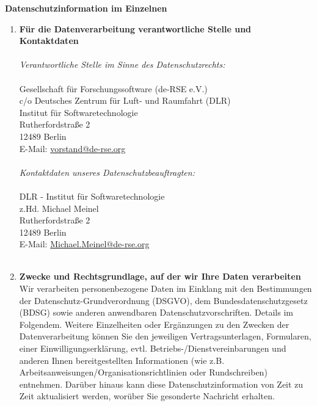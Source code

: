 \documentclass[a4paper, fontsize=11pt]{scrartcl}
\begin{document}
\vspace{1.5cm}
{\Large\textbf{Datenschutzinformation im Einzelnen}} \\

\begin{enumerate}[label=\textbf{\arabic*.},ref=\arabic*]
  \item \label{kontaktdaten} \textbf{Für die Datenverarbeitung verantwortliche Stelle und Kontaktdaten} \\\\
  \textit{Verantwortliche Stelle im Sinne des Datenschutzrechts:} \\\\
  Gesellschaft für Forschungssoftware (de-RSE e.V.) \\
  c/o Deutsches Zentrum für Luft- und Raumfahrt (DLR) \\
  Institut für Softwaretechnologie \\
  Rutherfordstraße 2 \\
  12489 Berlin \\
  E-Mail: \href{mailto:vorstand@de-rse.org}{vorstand@de-rse.org} \\\\
  \textit{Kontaktdaten unseres Datenschutzbeauftragten:} \\\\
  DLR - Institut für Softwaretechnologie\\
  z.Hd. Michael Meinel \\
  Rutherfordstraße 2 \\
  12489 Berlin \\
  E-Mail: \href{mailto:Michael.Meinel@de-rse.org}{Michael.Meinel@de-rse.org} \\\\
  \item \label{zwecke} \textbf{Zwecke und Rechtsgrundlage, auf der wir Ihre Daten verarbeiten} \\ Wir verarbeiten personenbezogene Daten im Einklang mit den Bestimmungen der Datenschutz-Grundverordnung (DSGVO), dem Bundesdatenschutzgesetz (BDSG) sowie anderen anwendbaren Datenschutzvorschriften. Details im Folgendem. Weitere Einzelheiten oder Ergänzungen zu den Zwecken der Datenverarbeitung können Sie den jeweiligen Vertragsunterlagen, Formularen, einer Einwilligungserklärung, evtl. Betriebs-/Dienstvereinbarungen und anderen Ihnen bereitgestellten Informationen (wie z.B. Arbeitsanweisungen/Organisationsrichtlinien oder Rundschreiben) entnehmen. Darüber hinaus kann diese Datenschutzinformation von Zeit zu Zeit aktualisiert werden, worüber Sie gesonderte Nachricht erhalten.

\end{enumerate}
\end{document}
